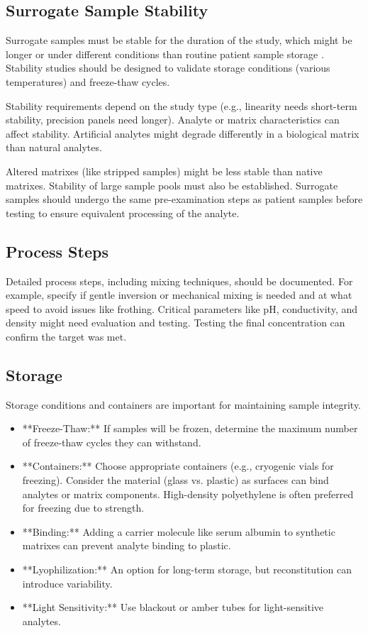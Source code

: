 \documentclass{article}
\begin{document}
\subsection{Surrogate Sample Stability}

Surrogate samples must be stable for the duration of the study, which might be longer or under different conditions than routine patient sample storage \cite{CLSIEP25}. Stability studies should be designed to validate storage conditions (various temperatures) and freeze-thaw cycles.

Stability requirements depend on the study type (e.g., linearity needs short-term stability, precision panels need longer). Analyte or matrix characteristics can affect stability. Artificial analytes might degrade differently in a biological matrix than natural analytes.

Altered matrixes (like stripped samples) might be less stable than native matrixes. Stability of large sample pools must also be established. Surrogate samples should undergo the same pre-examination steps as patient samples before testing to ensure equivalent processing of the analyte.

\subsection{Process Steps}

Detailed process steps, including mixing techniques, should be documented. For example, specify if gentle inversion or mechanical mixing is needed and at what speed to avoid issues like frothing. Critical parameters like pH, conductivity, and density might need evaluation and testing. Testing the final concentration can confirm the target was met.

\subsection{Storage}

Storage conditions and containers are important for maintaining sample integrity.
\begin{itemize}
    \item **Freeze-Thaw:** If samples will be frozen, determine the maximum number of freeze-thaw cycles they can withstand.
    \item **Containers:** Choose appropriate containers (e.g., cryogenic vials for freezing). Consider the material (glass vs. plastic) as surfaces can bind analytes or matrix components. High-density polyethylene is often preferred for freezing due to strength.
    \item **Binding:** Adding a carrier molecule like serum albumin to synthetic matrixes can prevent analyte binding to plastic.
    \item **Lyophilization:** An option for long-term storage, but reconstitution can introduce variability.
    \item **Light Sensitivity:** Use blackout or amber tubes for light-sensitive analytes.
\end{itemize}
\end{document}

